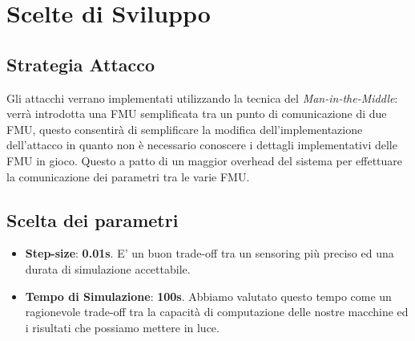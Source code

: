 \section{Scelte di Sviluppo}
\subsection{Strategia Attacco}
Gli attacchi verrano implementati utilizzando la tecnica del \textit{Man-in-the-Middle}: verrà introdotta una FMU semplificata tra un punto di comunicazione di due FMU, questo consentirà di semplificare la modifica dell'implementazione dell'attacco in quanto non è necessario conoscere i dettagli implementativi delle FMU in gioco. Questo a patto di un maggior overhead del sistema per effettuare la comunicazione dei parametri tra le varie FMU.
\subsection{Scelta dei parametri}

\begin{itemize}
	\item \textbf{Step-size}: \textbf{0.01s}. E' un buon trade-off tra un sensoring più preciso ed una durata di simulazione accettabile.
	\item \textbf{Tempo di Simulazione}: \textbf{100s}. Abbiamo valutato questo tempo come un ragionevole trade-off tra la capacità di computazione delle nostre macchine ed i risultati che possiamo mettere in luce. 
\end{itemize}